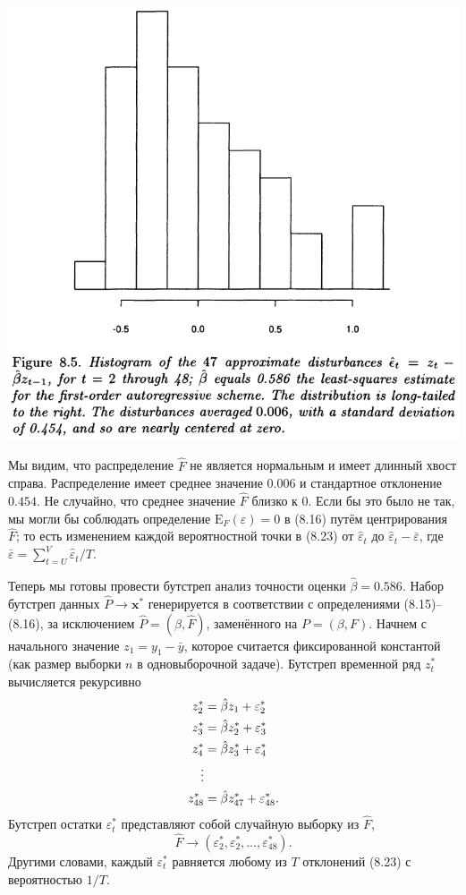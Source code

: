 \noindent
\includegraphics[width=\linewidth]{8/f85}
\newline

Мы видим, что распределение $\hat{F}$ не является нормальным и имеет длинный хвост справа. Распределение имеет среднее значение $0.006$ и стандартное отклонение $0.454$. Не случайно, что среднее значение $\hat{F}$ близко к $0$. Если бы это было не так, мы могли бы соблюдать определение $\text{E}_F(\varepsilon) = 0$ в (8.16) путём центрирования $\hat{F}$; то есть изменением каждой вероятностной точки в (8.23) от $\hat{\varepsilon}_t$ до $\hat{\varepsilon}_t - \bar{\varepsilon}$, где $\bar{\varepsilon} = \sum_{t=U}^{V} \hat{\varepsilon}_t/T$.

Теперь мы готовы провести бутстреп анализ точности оценки $\hat{\beta} = 0.586$. Набор бутстреп данных $\hat{P} \to \textbf{x}^*$ генерируется в соответствии с определениями (8.15)--(8.16), за исключением $\hat{P} = (\hat{\beta}, \hat{F})$, заменённого на $P = (\beta, F)$. Начнем с начального значение $z_1 = y_1 - \bar{y}$, которое считается фиксированной константой (как размер выборки $n$ в одновыборочной задаче). Бутстреп временной ряд $z_t^*$ вычисляется рекурсивно
\begin{align}
	z_2^* & = \hat{\beta} z_1 + \varepsilon_2^* \notag \\
	z_3^* & = \hat{\beta} z_2^* + \varepsilon_3^* \notag \\
	z_4^* & = \hat{\beta} z_3^* + \varepsilon_4^* \notag \\
	\vdots & \notag \\
	z_{48}^* & = \hat{\beta} z_{47}^* + \varepsilon_{48}^*.
\end{align}
Бутстреп остатки $\varepsilon_t^*$ представляют собой случайную выборку из $\hat{F}$,
\begin{equation}
	\hat{F} \to (\varepsilon_2^*, \varepsilon_2^*, \ldots, \varepsilon_{48}^*).
\end{equation}
Другими словами, каждый $\varepsilon_t^*$ равняется любому из $T$ отклонений (8.23) с вероятностью $1/T$.

